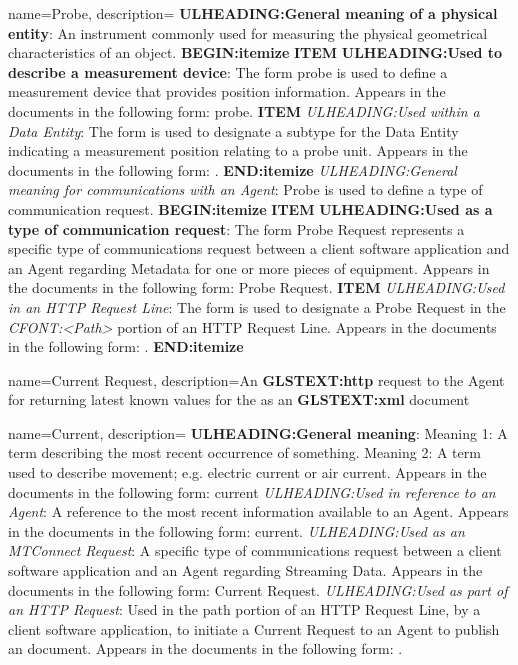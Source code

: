{
    name={Probe},
	description={
	\textbf{ULHEADING:General meaning of a physical entity}:
	An instrument commonly used for measuring the physical geometrical characteristics of an object.
    \textbf{BEGIN:itemize}
	\textbf{ITEM} \textbf{ULHEADING:Used to describe a measurement device}:
	The form probe is used to define a measurement device that provides position information.
	Appears in the documents in the following form: probe. 
	\textbf{ITEM} \textit{ULHEADING:Used within a \gls{Data Entity}}:
	The form  is used to designate a subtype for the \gls{Data Entity}  indicating a measurement position relating to a probe unit.
	Appears in the documents in the following form: .
    \textbf{END:itemize}
	\textit{ULHEADING:General meaning for communications with an \gls{Agent}}:
	Probe is used to define a type of communication request. 
    \textbf{BEGIN:itemize}
	\textbf{ITEM} \textbf{ULHEADING:Used as a type of communication request}:
	The form \gls{Probe Request} represents a specific type of communications request between a client software application and an \gls{Agent} regarding \gls{Metadata} for one or more pieces of equipment.
	Appears in the documents in the following form: \gls{Probe Request}.
	\textbf{ITEM} \textit{ULHEADING:Used in an \gls{HTTP Request Line}}:
	The form  is used to designate a \gls{Probe Request} in the \textit{CFONT:<Path>} portion of an \gls{HTTP Request Line}.
	Appears in the documents in the following form: .
    \textbf{END:itemize}
}
}

{
    name={Current Request},
	description={An \textbf{GLSTEXT:http} request to the \gls{Agent} for returning latest known values for the  as an  \textbf{GLSTEXT:xml} document}
}

{
    name={Current},
	description={
	\textbf{ULHEADING:General meaning}:
	Meaning 1:  A term describing the most recent occurrence of something.
	Meaning 2:  A term used to describe movement; e.g. electric current or air current.
	Appears in the documents in the following form: current
	\textit{ULHEADING:Used in reference to an \gls{Agent}}:
	A reference to the most recent information available to an \gls{Agent}.
	Appears in the documents in the following form: current.
	\textit{ULHEADING:Used as an \gls{MTConnect Request}}:
	A specific type of communications request between a client software application and an \gls{Agent} regarding \gls{Streaming Data}.  
	Appears in the documents in the following form: \gls{Current Request}.
	\textit{ULHEADING:Used as part of an \gls{HTTP Request}}:
	Used in the path portion of an \gls{HTTP Request Line}, by a client software application, to initiate a \gls{Current Request} to an \gls{Agent} to publish an  document.
	Appears in the documents in the following form: .
}
}

